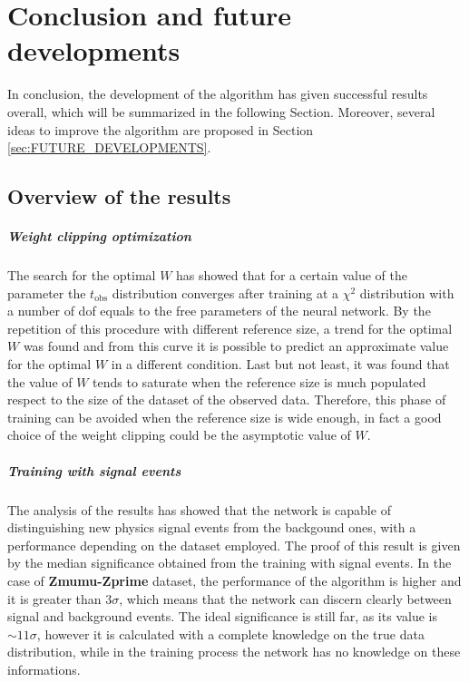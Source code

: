 \chapter{Conclusion and future developments}
\label{chap:CONCLUSION}




In conclusion, the development of the algorithm has given successful results overall, which will be summarized in the following Section. Moreover, several ideas to improve the algorithm are proposed in Section \ref{sec:FUTURE_DEVELOPMENTS}. 

\section{Overview of the results}
\label{sec:OVERVIEW}

\paragraph*{Weight clipping optimization}
The search for the optimal $W$ has showed that for a certain value of the parameter the $t_\mathrm{obs}$ distribution converges after training at a $\chi^2$ distribution with a number of dof equals to the free parameters of the neural network. By the repetition of this procedure with different reference size, a trend for the optimal $W$ was found and from this curve it is possible to predict an approximate value for the optimal $W$ in a different condition. Last but not least, it was found that the value of $W$ tends to saturate when the reference size is much populated respect to the size of the dataset of the observed data. Therefore, this phase of training can be avoided when the reference size is wide enough, in fact a good choice of the weight clipping could be the asymptotic value of $W$.

\paragraph*{Training with signal events}
The analysis of the results has showed that the network is capable of distinguishing new physics signal events from the backgound ones, with a performance depending on the dataset employed. The proof of this result is given by the median significance obtained from the training with signal events. In the case of \textbf{Zmumu-Zprime} dataset, the performance of the algorithm is higher and it is greater than $3\sigma$, which means that the network can discern clearly between signal and background events. The ideal significance is still far, as its value is $\sim 11\sigma$, however it is calculated with a complete knowledge on the true data distribution, while in the training process the network has no knowledge on these informations.

